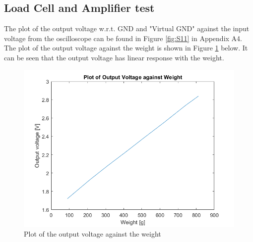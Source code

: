 \documentclass[class=report,11pt,crop=false]{standalone}
\begin{document}
	\subsection{Load Cell and Amplifier test}
	The plot of the output voltage w.r.t. GND and "Virtual GND" against the input voltage from the oscilloscope can be found in Figure \ref{fig:S11} in Appendix A4. The plot of the output voltage against the weight is shown in Figure \ref{fig:S12} below. It can be seen that the output voltage has linear response with the weight. 
	\begin{figure}[h!]
		\centering
		\includegraphics[width=0.4\linewidth]{Figures/Result2.png}
		\caption{Plot of the output voltage against the weight}
		\label{fig:S12}
	\end{figure}
	
	
	\ifstandalone
	
	\printnoidxglossary[type=\acronymtype,nonumberlist]
	\fi
\end{document}
